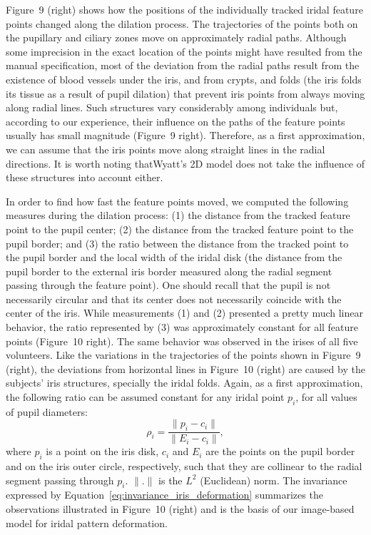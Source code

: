 \documentclass{acmtog} %
\begin{document}
Figure~9 (right) shows how the positions of the individually tracked
iridal feature points changed along the dilation process. The
trajectories of the points both on the pupillary and ciliary zones move
on approximately radial paths. Although some imprecision in the exact
location of the points might have resulted from the manual
specification, most of the deviation from the radial paths result from
the existence of blood vessels under the iris, and from crypts, and
folds (the iris folds its tissue as a result of pupil dilation) that
prevent iris points from always moving along radial lines. Such
structures vary considerably among individuals but, according to our
experience, their influence on the paths of the feature points usually
has small magnitude (Figure~9 right). Therefore, as a first
approximation, we can assume that the iris points move along straight
lines in the radial directions. It is worth noting that\break Wyatt's 2D
model does not take the influence of these structures into account
either.

In order to find how fast the feature points moved, we computed the
following measures during the dilation process: (1) the distance from
the tracked feature point to the pupil center; (2) the distance from the
tracked feature point to the pupil border; and (3) the ratio between the
distance from the tracked point to the pupil border and the local width
of the iridal disk (the distance from the pupil border to the external
iris border measured along the radial segment passing through the
feature point). One should recall that the pupil is not necessarily
circular and that its center does not necessarily coincide with the
center of the iris. While measurements (1) and (2) presented a pretty
much linear behavior, the ratio represented by (3) was approximately
constant for all feature points (Figure~10 right). The same behavior was
observed in the irises of all five volunteers. Like the variations in
the trajectories of the points shown in Figure~9 (right), the deviations
from horizontal lines in Figure~10 (right) are caused by the subjects'
iris structures, specially the iridal folds. Again, as a first
approximation, the following ratio can be assumed constant for any
iridal point $p_i$, for all values of pupil diameters:
\begin{equation}
\rho_i = \frac{\|p_i - c_i\|}{\|E_i - c_i\|},
\label{eq:invariance_iris_deformation}
\end{equation}
where $p_i$ is a point on the iris disk, $c_i$ and $E_i$ are the points
on the pupil border and on the iris outer circle, respectively, such
that they are collinear to the radial segment passing through $p_i$.
$\|.\|$ is the $L^2$ (Euclidean) norm. The invariance expressed by
Equation~\ref{eq:invariance_iris_deformation} summarizes the
observations illustrated in Figure~10 (right) and is the basis of our
image-based model for iridal pattern deformation.
\end{document}
